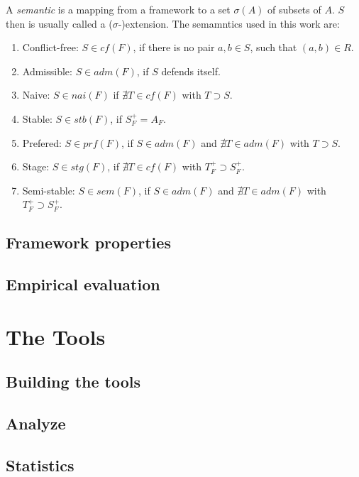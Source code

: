 \documentclass{scrartcl}
\begin{document}
A \emph{semantic} is a mapping from a framework to a set $\sigma(A)$ of subsets of $A$.
$S$ then is usually called a ($\sigma$-)extension. The semamntics used in this
work are:
\begin{enumerate}
  \item Conflict-free: $S \in cf(F)$, if there is no pair $a,b \in S$, such that $(a,b) \in R$.
  \item Admissible: $S \in adm(F)$, if $S$ defends itself.
  \item Naive: $S \in nai(F)$ if $\nexists T\in cf(F)$ with $T \supset S$.
  \item Stable: $S \in stb(F)$, if $S_F^{+} = A_F$.
  \item Prefered: $S \in prf(F)$, if $S \in adm(F)$ and $\nexists T\in adm(F)$ with $T \supset S$.
  \item Stage: $S \in stg(F)$, if $\nexists T\in cf(F)$ with $T_F^{+} \supset S_F^{+}$.
  \item Semi-stable: $S \in sem(F)$, if $S \in adm(F)$ and $\nexists T\in adm(F)$ with
          $T_F^{+} \supset S_F^{+}$.
\end{enumerate}

\subsection{Framework properties}
\subsection{Empirical evaluation}

\section{The Tools}
\label{tools}
\subsection{Building the tools}
\subsection{Analyze}
\subsection{Statistics}
\end{document}
